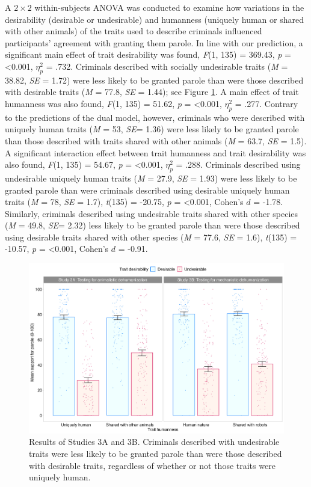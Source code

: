 \documentclass[
]{article}
\begin{document}
A \(2 \times 2\) within-subjects ANOVA was conducted to examine how variations in the desirability (desirable or undesirable) and humanness (uniquely human or shared with other animals) of the traits used to describe criminals influenced participants' agreement with granting them parole. In line with our prediction, a significant main effect of trait desirability was found, \emph{F}(1, 135) = 369.43, \emph{p} = \textless0.001, \(\eta_{p}^{2}\) = .732. Criminals described with socially undesirable traits (\emph{M} = 38.82, \emph{SE} = 1.72) were less likely to be granted parole than were those described with desirable traits (\emph{M} = 77.8, \emph{SE} = 1.44); see Figure \ref{fig:figure3}. A main effect of trait humanness was also found, \emph{F}(1, 135) = 51.62, \emph{p} = \textless0.001, \(\eta_{p}^{2}\) = .277. Contrary to the predictions of the dual model, however, criminals who were described with uniquely human traits (\emph{M} = 53, \emph{SE}= 1.36) were less likely to be granted parole than those described with traits shared with other animals (\emph{M} = 63.7, \emph{SE} = 1.5). A significant interaction effect between trait humanness and trait desirability was also found, \emph{F}(1, 135) = 54.67, \emph{p} = \textless0.001, \(\eta_{p}^{2}\) = .288. Criminals described using undesirable uniquely human traits (\emph{M} = 27.9, \emph{SE} = 1.93) were less likely to be granted parole than were criminals described using desirable uniquely human traits (\emph{M} = 78, \emph{SE} = 1.7), \emph{t}(135) = -20.75, \emph{p} = \textless0.001, Cohen's \(d\) = -1.78. Similarly, criminals described using undesirable traits shared with other species (\emph{M} = 49.8, \emph{SE}= 2.32) less likely to be granted parole than were those described using desirable traits shared with other species (\emph{M} = 77.6, \emph{SE} = 1.6), \emph{t}(135) = -10.57, \emph{p} = \textless0.001, Cohen's \(d\) = -0.91.

\begin{figure}

{\centering \includegraphics[width=0.9\linewidth]{figures/plot3} 

}

\caption{Results of Studies 3A and 3B.  Criminals described with undesirable traits were less likely to be granted parole than were those described with desirable traits, regardless of whether or not those traits were uniquely human.}\label{fig:figure3}
\end{figure}
\end{document}
